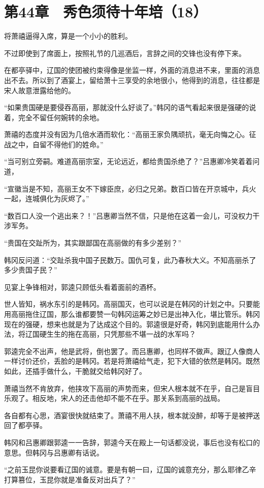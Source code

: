 \section{第44章　秀色须待十年培（18）}

将萧禧逼得入席，算是一个小小的胜利。

不过即使到了席面上，按照礼节的几巡酒后，言辞之间的交锋也没有停下来。

在都亭驿中，辽国的使团被约束得像是坐监一样，外面的消息进不来，里面的消息出不去。所以到了酒宴上，留给萧十三享受的余地很小，他得到的消息，往往都是宋人故意泄露给他的。

“如果贵国硬是要侵吞高丽，那就没什么好谈了。”韩冈的语气看起来很是强硬的说着，完全不留任何婉转的余地。

萧禧的态度并没有因为几倍水酒而软化：“高丽王家负隅顽抗，毫无向悔之心。征战之中，自留不得他们的姓命。”

“当可别立旁嗣。难道高丽宗室，无论远近，都给贵国杀绝了？”吕惠卿冷笑着着问道，

“宣徽当是不知，高丽王女不下嫁臣庶，必归之兄弟。数百口皆在开京城中，兵火一起，连城俱化为灰烬了。”

“数百口人没一个逃出来？！”吕惠卿当然不信，只是他在这着一会儿，可没权力干涉军务。

“贵国在交趾所为，其实跟鄙国在高丽做的有多少差别？”

韩冈反问道：“交趾杀我中国子民数万。国仇可复，此乃春秋大义。不知高丽杀了多少贵国子民？”

见宴上争锋相对，郭逵只顾低头看着面前的酒杯。

世人皆知，祸水东引的是韩冈。高丽国灭，也可以说是在韩冈的计划之中。只要能用高丽拖住辽国，那么谁都要赞一句韩冈运筹之妙已是出神入化，堪比管乐。韩冈现在的强硬，想来也就是为了达成这个目的。郭逵很是好奇，韩冈到底能用什么办法，将辽国硬生生的拖在高丽，只凭那些不堪一战的水军吗？

郭逵完全不出声，他是武将，倒也罢了。而吕惠卿，也同样不做声。跟辽人像商人一样讨价还价，丢脸的是韩冈。若是将萧禧给气走，犯下大错的依然是韩冈。既然如此，还插手做什么，干脆就交给韩冈好了。

萧禧当然不肯放弃，他挟攻下高丽的声势而来，但宋人根本就不在乎，自己是盲目乐观了。相反地，宋人的还击他却不能不在乎。那关系到高丽的战局。

各自都有心思，酒宴很快就结束了。萧禧不用人扶，根本就没醉，却等于是被押送回了都亭驿。

韩冈和吕惠卿跟郭逵一一告辞，郭逵今天在殿上一句话都没说，事后也没有松口的意思。但韩冈与吕惠卿有话说。

“之前玉昆你说要看辽国的诚意。要是有朝一曰，辽国的诚意充分，那么耶律乙辛打算篡位，玉昆你就是准备反对出兵了？”


